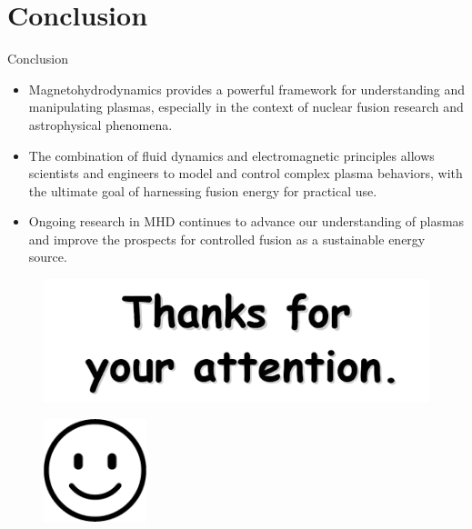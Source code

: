 \documentclass[13pt]{beamer}
\begin{document}
\section{Conclusion}
\begin{frame}[t]{Conclusion}

\begin{itemize}
	\item Magnetohydrodynamics provides a powerful framework for understanding and manipulating plasmas, especially in the context of nuclear fusion research and astrophysical phenomena.
	\item 	The combination of fluid dynamics and electromagnetic principles allows scientists and engineers to model and control complex plasma behaviors, with the ultimate goal of harnessing fusion energy for practical use.
	\item 	Ongoing research in MHD continues to advance our understanding of plasmas and improve the prospects for controlled fusion as a sustainable energy source.

\end{itemize}



\end{frame}

\begin{frame}

	\begin{figure}

		\includegraphics[width =0.9 \textwidth]{Images/thanks-removebg-preview.png}
	\end{figure}

	\begin{figure}
		\centering
		\includegraphics[width = 3cm]{Images/smile-removebg-preview.png}
	\end{figure}

\end{frame}
\end{document}
